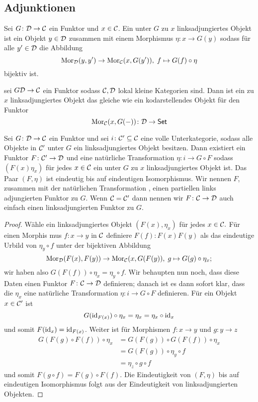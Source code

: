 \subsection{Adjunktionen}
\begin{Def}
    Sei $G\colon\mathcal{D}\to\mathcal{C}$ ein Funktor und $x\in\mathcal{C}$. Ein unter $G$ zu $x$ linksadjungiertes Objekt ist ein Objekt $y\in\mathcal{D}$ zusammen mit einem Morphismus $\eta\colon x\to G(y)$ sodass für alle $y'\in\mathcal{D}$ die Abbildung 
    $$\operatorname{Mor}_{\mathcal{D}}(y,y')\to\operatorname{Mor}_{\mathcal{C}}(x,G(y')), \; f\mapsto G(f)\circ\eta$$ bijektiv ist.
\end{Def}
\begin{Bem}
    sei $G\mathcal{D}\to\mathcal{C}$ ein Funktor sodass $\mathcal{C},\mathcal{D}$ lokal kleine Kategorien sind. Dann ist ein zu $x$ linksadjungiertes Objekt das gleiche wie ein kodarstellendes Objekt für den Funktor $$\operatorname{Mor}_{\mathcal{C}}(x,G(-))\colon \mathcal{D}\to\mathsf{Set}$$
\end{Bem}
\begin{Satz}\label{Satz:AdjFun}
    Sei $G\colon\mathcal{D}\to\mathcal{C}$ ein Funktor und sei $i\colon \mathcal{C}'\subseteq \mathcal{C}$ eine volle Unterkategorie, sodass alle Objekte in $\mathcal{C}'$ unter $G$ ein linksadjungiertes Objekt besitzen. Dann existiert ein Funktor $F\colon \mathcal{C}'\to\mathcal{D}$ und eine natürliche Transformation $\eta\colon i\to G\circ F$ sodass $(F(x) \eta_x)$ für jedes $x\in\mathcal{C}$ ein unter $G$ zu $x$ linksadjungiertes Objekt ist. Das Paar
 $(F,\eta )$ ist eindeutig bis auf eindeutigen Isomorphismus.
 Wir nennen $F$, zusammen mit der natürlichen Transformation , einen partiellen links
adjungierten Funktor zu $G$. Wenn $\mathcal{C}= \mathcal{C}'$ dann nennen wir $F\colon \mathcal{C}\to \mathcal{D}$ auch einfach einen
 linksadjungierten Funktor zu $G$.
\end{Satz}
\begin{proof}
    Wähle ein linksadjungiertes Objekt $(F(x), \eta_x)$ für jedes $x\in\mathcal{C}.$ Für einen Morphis
mus $f\colon x\to y$ in $\mathcal{C}$ definiere $F(f)\colon F(x) F(y)$ als das eindeutige Urbild von $\eta_y\circ f$ unter
 der bijektiven Abbildung
 $$\operatorname{Mor}_{\mathcal{D}} (F(x),F(y))\to \operatorname{Mor}_{\mathcal{C}} (x,G(F(y)),\; g\mapsto G(g)\circ \eta_x;$$
 wir haben also $G(F(f))\circ\eta_x = \eta_y\circ f.$
 Wir behaupten nun noch, dass diese Daten einen Funktor $F\colon \mathcal{C}
 \to \mathcal{D}$ definieren; danach
 ist es dann sofort klar, dass die $\eta_x$ eine natürliche Transformation $\eta\colon i\to G\circ F$ definieren.
 Für ein Objekt $x\in\mathcal{C}'$ ist
$$ G(\mathrm{id}_{F(x)})\circ\eta_x = \eta_x= \eta_x \circ\mathrm{id}_x$$
 und somit $F(\mathrm{id}_x) = \mathrm{id}_{F(x)}$. Weiter ist für Morphismen $f\colon x\to y$ und $g\colon  y\to  z$
\begin{align*}
    G(F(g)\circ F(f))\circ \eta_x&=G(F(g))\circ G(F(f))\circ\eta_x\\
 &=G(F(g))\circ\eta_y\circ f\\
 &= \eta_z\circ g\circ f
\end{align*} 
 und somit $F(g\circ f) = F(g)\circ F(f).$
 Die Eindeutigkeit von $(F,\eta)$ bis auf eindeutigen Isomorphismus folgt aus der Eindeutigkeit
 von linksadjungierten Objekten.
\end{proof}
